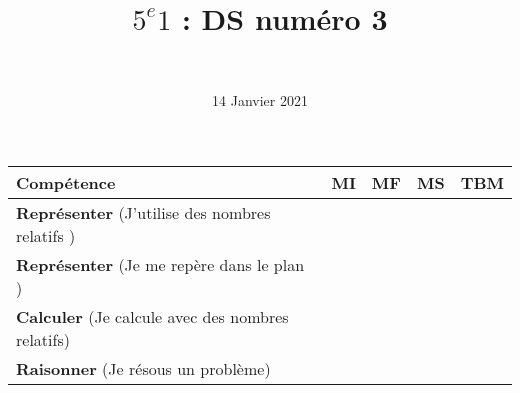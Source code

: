 \documentclass[a4paper,11pt]{exam}
\author{\ }
\date{14 Janvier 2021}
\title{$5^e 1$ : DS num\'ero 3}
\begin{document}
%	

	\maketitle
%	

\begin{small}
	\begin{center}
		\begin{tabular}{|@{\ }l@{\ }|@{\ }c@{\ }|@{\ }c@{\ }|@{\ }c@{\ }|@{\ }c@{\ }|}
			\hline
			\textbf{Compétence} & \textbf{MI} & \textbf{MF} & \textbf{MS} & \textbf{TBM} \\
			\hline
			\textbf{Représenter} (J'utilise des nombres relatifs ) &  \ \ & \ \ & \ \ & \ \  \\
			\hline
			\textbf{Représenter} (Je me repère dans le plan ) &  \ \ & \ \ & \ \ & \ \  \\
			\hline
			\textbf{Calculer} (Je calcule avec des nombres relatifs)&  \ \ & \ \ & \ \ & \ \  \\
			\hline	
			\textbf{Raisonner} (Je résous un problème) & \ \ & \ \ &  \ \  & \ \ \\
			\hline
%			 
		\end{tabular}
	\end{center}
\end{small}	

	
	




\newpage








\label{LastPage}

%
\end{document}
